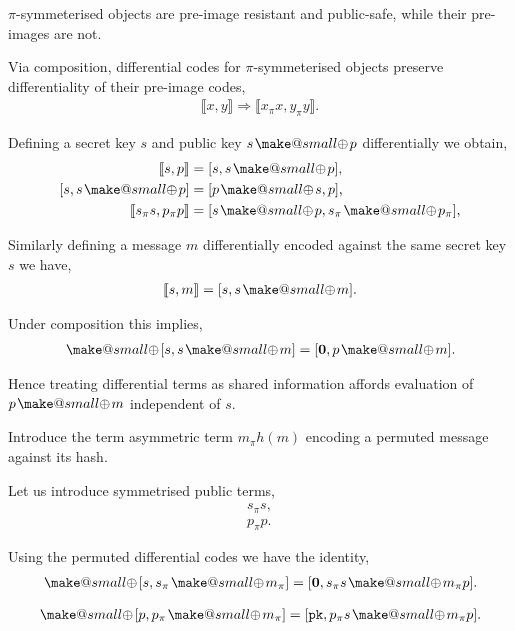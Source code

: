 \documentclass[twocolumn, aps, amsmath, amssymb, nofootinbib, superscriptaddress, longbibliography, doublefloatfix, table-of-contents, eqsecnum, rmp]{revtex4-2}
\makeatletter
\def\diff#1#2{\llbracket #1,#2\rrbracket}
\newcommand{\soplus}{{{\hspace{1pt}}{\mathbin{\mathpalette\make@small{\mathbin\oplus}}}}{\hspace{1pt}}}
\newcommand{\make@small}[2]{%
  \vcenter{\hbox{%
    \scalebox{0.6}{$\m@th#1#2$}%
  }}%
}
\makeatother
\begin{document}
$\pi$-symmeterised objects are pre-image resistant and public-safe, while their pre-images are not.

Via composition, differential codes for $\pi$-symmeterised objects preserve differentiality of their pre-image codes,
\begin{align}
	\diff{x}{y} \Rightarrow \diff{x_\pi x}{y_\pi y}.
\end{align}

Defining a secret key $s$ and public key $s\soplus p$ differentially we obtain,
\begin{align}
	\diff{s}{p} &= [s, s\soplus p],\nonumber\\
	[s, s\soplus p] &= [p\soplus s, p],\nonumber\\
	\diff{s_\pi s}{p_\pi p} &= [s\soplus p, s_\pi\soplus p_\pi],\nonumber\\
\end{align}

Similarly defining a message $m$ differentially encoded against the same secret key $s$ we have,
\begin{align}
	\diff{s}{m} = [s,s\soplus m].
\end{align}

Under composition this implies,
\begin{align}
	[s,s\soplus p] \soplus [s,s\soplus m] = [\mathbf{0},p\soplus m].	
\end{align}

Hence treating differential terms as shared information affords evaluation of $p\soplus m$ independent of $s$.

Introduce the term asymmetric term $m_\pi h(m)$ encoding a permuted message against its hash.


Let us introduce symmetrised public terms,
\begin{align}
	s_\pi s, \nonumber\\
	p_\pi p.	
\end{align}

Using the permuted differential codes we have the identity,
\begin{align}
	[s,s \soplus p] \soplus [s, s_\pi \soplus m_\pi] = [\mathbf{0}, s_\pi s \soplus m_\pi p].
\end{align}

\begin{align}
	[s,s \soplus p] \soplus [p,p_\pi \soplus m_\pi] = [\mathtt{pk}, p_\pi s \soplus m_\pi p].
\end{align}
\end{document}
